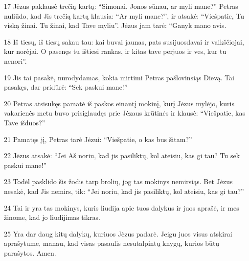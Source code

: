 \par 17 Jėzus paklausė trečią kartą: “Simonai, Jonos sūnau, ar myli mane?” Petras nuliūdo, kad Jis trečią kartą klausia: “Ar myli mane?”, ir atsakė: “Viešpatie, Tu viską žinai. Tu žinai, kad Tave myliu”. Jėzus jam tarė: “Ganyk mano avis. 
\par 18 Iš tiesų, iš tiesų sakau tau: kai buvai jaunas, pats susijuosdavai ir vaikščiojai, kur norėjai. O pasenęs tu ištiesi rankas, ir kitas tave perjuos ir ves, kur tu nenori”. 
\par 19 Jis tai pasakė, nurodydamas, kokia mirtimi Petras pašlovinsiąs Dievą. Tai pasakęs, dar pridūrė: “Sek paskui mane!” 
\par 20 Petras atsisukęs pamatė iš paskos einantį mokinį, kurį Jėzus mylėjo, kuris vakarienės metu buvo prisiglaudęs prie Jėzaus krūtinės ir klausė: “Viešpatie, kas Tave išduos?” 
\par 21 Pamatęs jį, Petras tarė Jėzui: “Viešpatie, o kas bus šitam?” 
\par 22 Jėzus atsakė: “Jei Aš noriu, kad jis pasiliktų, kol ateisiu, kas gi tau? Tu sek paskui mane!” 
\par 23 Todėl pasklido šis žodis tarp brolių, jog tas mokinys nemirsiąs. Bet Jėzus nesakė, kad Jis nemirs, tik: “Jei noriu, kad jis pasiliktų, kol ateisiu, kas gi tau?” 
\par 24 Tai ir yra tas mokinys, kuris liudija apie tuos dalykus ir juos aprašė, ir mes žinome, kad jo liudijimas tikras. 
\par 25 Yra dar daug kitų dalykų, kuriuos Jėzus padarė. Jeigu juos visus atskirai aprašytume, manau, kad visas pasaulis nesutalpintų knygų, kurios būtų parašytos. Amen.





